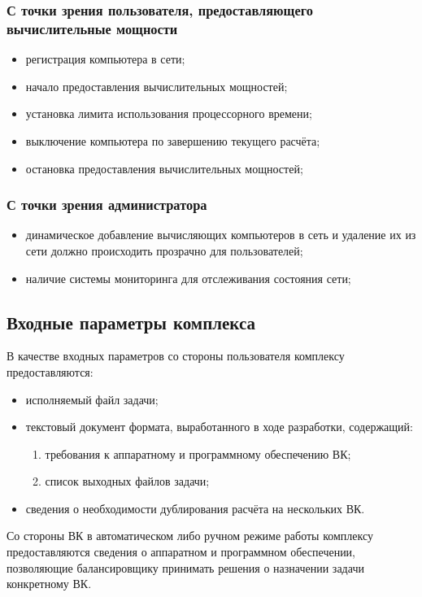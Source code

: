 \documentclass[a4paper,12pt]{report}
\numberwithin{equation}{section}
\begin{document}
\subsubsection{С точки зрения пользователя, предоставляющего вычислительные мощности}
\begin{itemize}
  \item регистрация компьютера в сети;
  \item начало предоставления вычислительных мощностей;
  \item установка лимита использования процессорного времени;
  \item выключение компьютера по завершению текущего расчёта;
  \item остановка предоставления вычислительных мощностей;
\end{itemize}

\subsubsection{С точки зрения администратора}
\begin{itemize}
  \item динамическое добавление вычисляющих компьютеров в сеть и удаление их из сети должно происходить прозрачно для пользователей;
  \item наличие системы мониторинга для отслеживания состояния сети;
\end{itemize}


\subsection{Входные параметры комплекса}
В качестве входных параметров со стороны пользователя комплексу предоставляются:
\begin{itemize}
  \item исполняемый файл задачи;
  \item текстовый документ формата, выработанного в ходе разработки, содержащий: 
  \begin{enumerate}
    \item требования к аппаратному и программному обеспечению ВК;
    \item список выходных файлов задачи;
  \end{enumerate}
  \item сведения о необходимости дублирования расчёта на нескольких ВК.
\end{itemize}

Со стороны ВК в автоматическом либо ручном режиме работы комплексу предоставляются сведения о аппаратном и программном обеспечении, 
позволяющие балансировщику принимать решения о назначении задачи конкретному ВК.
\end{document}

